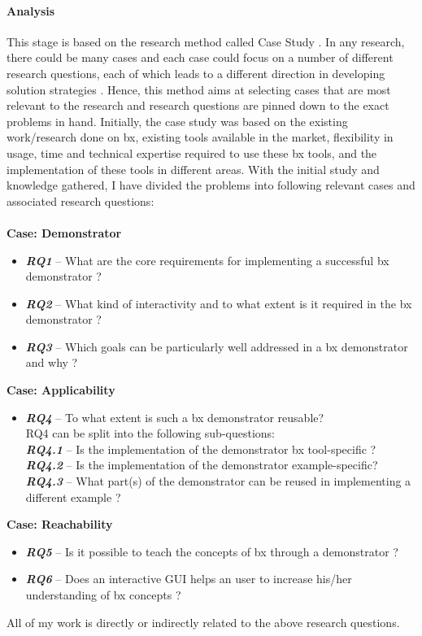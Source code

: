 \paragraph{Analysis}
This stage is based on the research method called Case Study \cite{semethods}. In any research, there could be many cases and each case could focus on a number of different research questions, each of which leads to a different direction in developing solution strategies \cite{semethods}. Hence, this method aims at selecting cases that are most relevant to the research and research questions are pinned down to the exact problems in hand. 
\newline\newline Initially, the case study was based on the existing work/research done on bx, existing tools available in the market, flexibility in usage, time and technical expertise required to use these bx tools, and the implementation of these tools in different areas. With the initial study and knowledge gathered, I have divided the problems into following relevant cases and associated research questions:\\\\
\textbf{Case: Demonstrator}
\begin{itemize}
\item {\textbf{\textit{RQ1}} -- What are the core requirements for implementing a successful bx demonstrator ?}
\item {\textbf{\textit{RQ2}} -- What kind of interactivity and to what extent is it required in the bx demonstrator ?}
\item {\textbf{\textit{RQ3}} -- Which goals can be particularly well addressed in a bx demonstrator and why ?}
\end{itemize}
\textbf{Case: Applicability}
\begin{itemize}
\item {\textbf{\textit{RQ4}} -- To what extent is such a bx demonstrator reusable?}
\\RQ4 can be split into the following sub-questions:
\\\textbf{\textit{RQ4.1}} -- Is the implementation of the demonstrator bx tool-specific ?
\\\textbf{\textit{RQ4.2}} -- Is the implementation of the demonstrator example-specific?
\\\textbf{\textit{RQ4.3}} -- What part(s) of the demonstrator can be reused in implementing a different example ?
\end{itemize}
\textbf{Case: Reachability}
\begin{itemize}
\item {\textbf{\textit{RQ5}} -- Is it possible to teach the concepts of bx through a demonstrator ?}
\item {\textbf{\textit{RQ6}} -- Does an interactive GUI helps an user to increase his/her understanding of bx concepts ?}
\end{itemize}
All of my work is directly or indirectly related to the above research questions.


